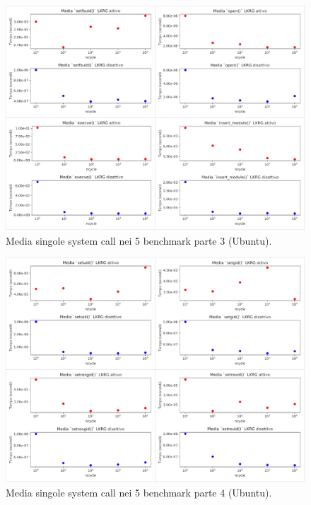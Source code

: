 \begin{figure}[!htbp]
\centering
\includegraphics[scale=1.3]{Figures/Ubuntu/Mean3}
\caption[Media singole system call nei 5 benchmark parte 3 (Ubuntu)]{Media singole system call nei 5 benchmark parte 3 (Ubuntu).}
\label{fig:mean3UbuntuFig}
\end{figure}

\begin{figure}[!htbp]
\centering
\includegraphics[scale=1.3]{Figures/Ubuntu/Mean4}
\caption[Media singole system call nei 5 benchmark parte 4 (Ubuntu)]{Media singole system call nei 5 benchmark parte 4 (Ubuntu).}
\label{fig:mean4UbuntuFig}
\end{figure}

